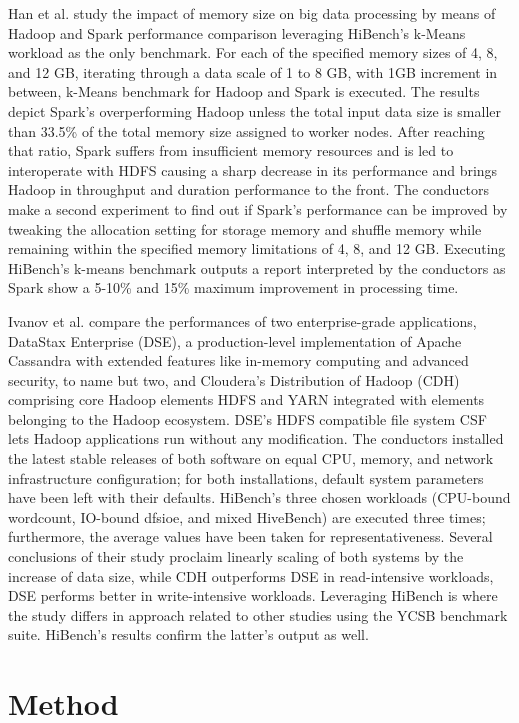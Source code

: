 \documentclass[review]{elsarticle}
\begin{document}
Han et al. \cite{han_impact_2017} study the impact of memory size on big data processing by means of Hadoop and Spark performance comparison leveraging HiBench's k-Means workload as the only benchmark. For each of the specified memory sizes of 4, 8, and 12 GB, iterating through a data scale of 1 to 8 GB, with 1GB increment in between, k-Means benchmark for Hadoop and Spark is executed. The results depict Spark's overperforming Hadoop unless the total input data size is smaller than 33.5\% of the total memory size assigned to worker nodes. After reaching that ratio, Spark suffers from insufficient memory resources and is led to interoperate with HDFS causing a sharp decrease in its performance and brings Hadoop in throughput and duration performance to the front. The conductors make a second experiment to find out if Spark's performance can be improved by tweaking the allocation setting for storage memory and shuffle memory while remaining within the specified memory limitations of 4, 8, and 12 GB. Executing HiBench's k-means benchmark outputs a report interpreted by the conductors as Spark show a 5-10\% and 15\% maximum improvement in processing time.

Ivanov et al. \cite{ivanov_performance_2015} compare the performances of two enterprise-grade applications, DataStax Enterprise (DSE), a production-level implementation of Apache Cassandra with extended features like in-memory computing and advanced security, to name but two, and Cloudera's Distribution of Hadoop (CDH) comprising core Hadoop elements HDFS and YARN integrated with elements belonging to the Hadoop ecosystem. DSE's HDFS compatible file system CSF lets Hadoop applications run without any modification. The conductors installed the latest stable releases of both software on equal CPU, memory, and network infrastructure configuration; for both installations, default system parameters have been left with their defaults. HiBench's three chosen workloads (CPU-bound wordcount, IO-bound dfsioe, and mixed HiveBench) are executed three times; furthermore, the average values have been taken for representativeness. Several conclusions of their study proclaim linearly scaling of both systems by the increase of data size, while CDH outperforms DSE in read-intensive workloads, DSE performs better in write-intensive workloads. Leveraging HiBench is where the study differs in approach related to other studies using the YCSB benchmark suite. HiBench's results confirm the latter's output as well.

\section{Method}
\end{document}
